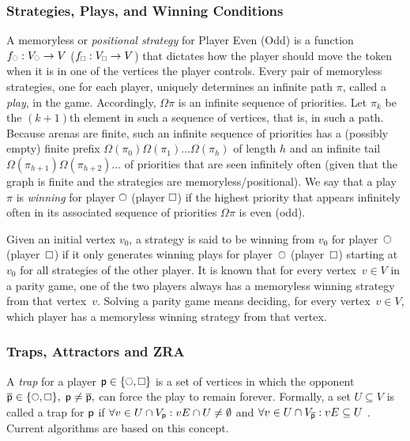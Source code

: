 \documentclass{article}
\begin{document}
\subsubsection{Strategies, Plays, and Winning Conditions}\label{sec:strategies}
A memoryless or {\em positional strategy} for Player Even (Odd) is a function $f_{\subeven} : V_{\subeven} \to V$ ($f_{\subodd} : V_{\subodd} \to V$) that dictates how the player should move the token when it is in one of the vertices the player controls. Every pair of memoryless strategies, one for each player, uniquely determines an infinite path $\pi$, called a {\em play}, in the game. Accordingly, $\Omega \pi$ is an infinite sequence of priorities. Let $\pi_k$ be the $(k+1)$th element in such a sequence of vertices, that is, in such a path. Because arenas are finite, such an infinite sequence of priorities has a (possibly empty) finite prefix $\Omega(\pi_0) \Omega(\pi_1) \ldots \Omega(\pi_h)$ of length $h$ and an infinite tail $\Omega(\pi_{h+1}) \Omega(\pi_{h+2}) \ldots$ of priorities that are seen infinitely often (given that the graph is finite and the strategies are memoryless/positional). We say that a play~$\pi$ is {\em winning} for player $\even$ (player $\odd$) if the highest priority that appears infinitely often in its associated sequence of priorities $\Omega \pi$ is even (odd). 

Given an initial vertex $v_0$, a strategy is said to be winning from $v_0$ for player~$\even$ (player~$\odd$) if it only generates winning plays for player~$\even$ (player~$\odd$) starting at $v_0$ for all strategies of the other player. It is known that for every vertex~$v\in V$ in a parity game, one of the two players always has a memoryless winning strategy from that vertex~$v$. Solving a parity game means deciding, for every vertex~$v\in V$, which player has a memoryless winning strategy from that vertex.

\subsubsection{Traps, Attractors and ZRA}

A \emph{trap} for a player $\player \in \{\even,\odd\}$ is a set of vertices in which the opponent $\opponent \in \{\even,\odd\}, \; \player \neq \opponent,$ can force the play to remain forever. Formally, a set $U \subseteq V$ is called a trap for $\player$ if $\forall v \in U \cap V_{\player} : vE \cap U \neq \emptyset$ and $\forall v \in U \cap V_{\opponent} : vE \subseteq U$ \cite{Zielonka:1998}. Current algorithms are based on this concept. 
\end{document}
